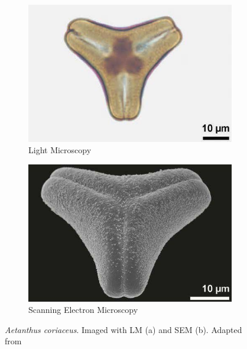 \begin{figure}[htb]
  \centering
  \begin{subfigure}[t]{0.4\textwidth}
    \centering
    \includegraphics[width=\textwidth]{figs/pollen_lm.jpg}
    \caption{Light Microscopy}
  \end{subfigure}%
  \hspace*{0.04\textwidth}
  \begin{subfigure}[t]{0.4\textwidth}
    \centering
    \includegraphics[width=\textwidth]{figs/pollen_sem.jpg}
    \caption{Scanning Electron Microscopy}
  \end{subfigure}
  \caption[Pollen grain using LM and SEM]{\textit{Aetanthus coriaceus}.
  Imaged with LM (a) and SEM (b).
  Adapted from \parencite{halbritter_methods_2018}}\label{fig:lm_and_sem}
\end{figure}

